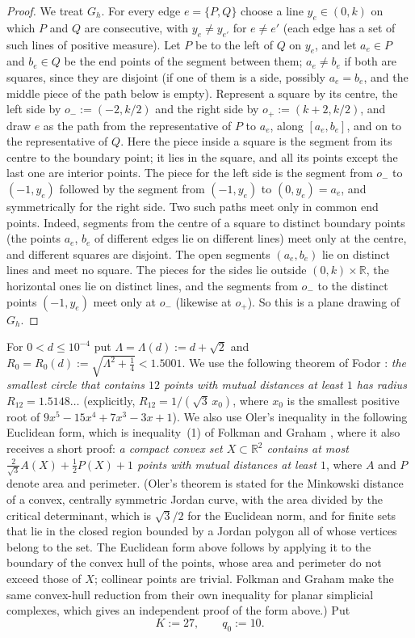 \documentclass[11pt]{amsart}
\theoremstyle{definition}
\theoremstyle{remark}
\newcommand{\R}{\mathbb{R}}
\begin{document}
\begin{proof}
We treat $G_h$. For every edge $e=\{P,Q\}$ choose a line $y_e\in(0,k)$ on which $P$ and $Q$ are consecutive, with
$y_e\ne y_{e'}$ for $e\ne e'$ (each edge has a set of such lines of positive measure). Let $P$ be to the left of $Q$ on
$y_e$, and let $a_e\in P$ and $b_e\in Q$ be the end points of the segment between them; $a_e\ne b_e$ if both are
squares, since they are disjoint (if one of them is a side, possibly $a_e=b_e$, and the middle piece of the path below is empty). Represent a square by its centre, the left side by $o_-:=(-2,k/2)$ and the right side
by $o_+:=(k+2,k/2)$, and draw $e$ as the path from the representative of $P$ to $a_e$, along $[a_e,b_e]$, and on to the
representative of $Q$. Here the piece inside a square is the segment from its centre to the boundary point; it lies in
the square, and all its points except the last one are interior points. The piece for the left side is the segment
from $o_-$ to $(-1,y_e)$ followed by the segment from $(-1,y_e)$ to $(0,y_e)=a_e$, and symmetrically for the right side.
Two such paths meet only in common end points. Indeed, segments from the centre of a square to distinct boundary points
(the points $a_e$, $b_e$ of different edges lie on different lines) meet only at the centre, and different squares are
disjoint. The open segments $(a_e,b_e)$ lie on distinct lines and meet no square. The pieces for the sides lie outside
$(0,k)\times\mathbb R$, the horizontal ones lie on distinct lines, and the segments from $o_-$ to the distinct points
$(-1,y_e)$ meet only at $o_-$ (likewise at $o_+$). So this is a plane drawing of $G_h$.
\end{proof}

For $0<d\le10^{-4}$ put $\Lambda=\Lambda(d):=d+\sqrt2$ and $R_0=R_0(d):=\sqrt{\Lambda^2+\frac14}<1.5001$. We use the
following theorem of Fodor \cite[Theorem~1]{Fod}: \emph{the smallest circle that contains $12$ points with mutual distances at least $1$
has radius $R_{12}=1.5148\ldots$} (explicitly, $R_{12}=1/(\sqrt3\,x_0)$, where $x_0$ is the smallest positive root of
$9x^5-15x^4+7x^3-3x+1$). We also use Oler's inequality \cite[Theorem~1]{Ole} in the following Euclidean form, which is
inequality~(1) of Folkman and Graham \cite{FG}, where it also receives a short proof: \emph{a compact convex set $X\subset\R^2$
contains at most $\frac2{\sqrt3}A(X)+\frac12P(X)+1$ points with mutual distances at least $1$}, where $A$ and $P$ denote area and
perimeter. (Oler's theorem is stated for the Minkowski distance of a convex, centrally symmetric Jordan curve, with the area
divided by the critical determinant, which is $\sqrt3/2$ for the Euclidean norm, and for finite sets that lie in the closed region
bounded by a Jordan polygon all of whose vertices belong to the set. The Euclidean form above follows by applying it to the boundary
of the convex hull of the points, whose area and perimeter do not exceed those of $X$; collinear points are trivial. Folkman and
Graham \cite[p.~751]{FG} make the same convex-hull reduction from their own inequality for planar simplicial complexes, which gives an
independent proof of the form above.) Put
\[
K:=27,\qquad q_0:=10 .
\]
\end{document}
